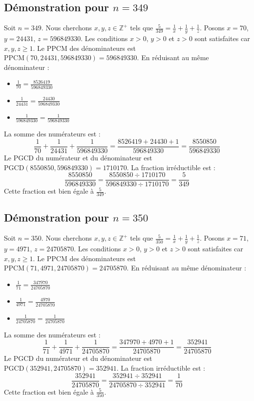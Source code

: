 \documentclass[11pt,a4paper]{article}
\begin{document}
\subsection{Démonstration pour $n = 349$}
Soit $n = 349$. Nous cherchons $x, y, z \in \mathbb{Z}^{+}$ tels que $\frac{5}{349} = \frac{1}{x} + \frac{1}{y} + \frac{1}{z}$.
Posons $x = 70$, $y = 24431$, $z = 596849330$.
Les conditions $x > 0$, $y > 0$ et $z > 0$ sont satisfaites car $x, y, z \geq 1$.
Le PPCM des dénominateurs est $\text{PPCM}(70, 24431, 596849330) = 596849330$.
En réduisant au même dénominateur :
\begin{itemize}
    \item $\frac{1}{70} = \frac{8526419}{596849330}$
    \item $\frac{1}{24431} = \frac{24430}{596849330}$
    \item $\frac{1}{596849330} = \frac{1}{596849330}$
\end{itemize}
La somme des numérateurs est :
$$ \frac{1}{70} + \frac{1}{24431} + \frac{1}{596849330} = \frac{8526419 + 24430 + 1}{596849330} = \frac{8550850}{596849330} $$
Le PGCD du numérateur et du dénominateur est $\text{PGCD}(8550850, 596849330) = 1710170$.
La fraction irréductible est :
$$ \frac{8550850}{596849330} = \frac{8550850 \div 1710170}{596849330 \div 1710170} = \frac{5}{349} $$
Cette fraction est bien égale à $\frac{5}{349}$.

\subsection{Démonstration pour $n = 350$}
Soit $n = 350$. Nous cherchons $x, y, z \in \mathbb{Z}^{+}$ tels que $\frac{5}{350} = \frac{1}{x} + \frac{1}{y} + \frac{1}{z}$.
Posons $x = 71$, $y = 4971$, $z = 24705870$.
Les conditions $x > 0$, $y > 0$ et $z > 0$ sont satisfaites car $x, y, z \geq 1$.
Le PPCM des dénominateurs est $\text{PPCM}(71, 4971, 24705870) = 24705870$.
En réduisant au même dénominateur :
\begin{itemize}
    \item $\frac{1}{71} = \frac{347970}{24705870}$
    \item $\frac{1}{4971} = \frac{4970}{24705870}$
    \item $\frac{1}{24705870} = \frac{1}{24705870}$
\end{itemize}
La somme des numérateurs est :
$$ \frac{1}{71} + \frac{1}{4971} + \frac{1}{24705870} = \frac{347970 + 4970 + 1}{24705870} = \frac{352941}{24705870} $$
Le PGCD du numérateur et du dénominateur est $\text{PGCD}(352941, 24705870) = 352941$.
La fraction irréductible est :
$$ \frac{352941}{24705870} = \frac{352941 \div 352941}{24705870 \div 352941} = \frac{1}{70} $$
Cette fraction est bien égale à $\frac{5}{350}$.
\end{document}
